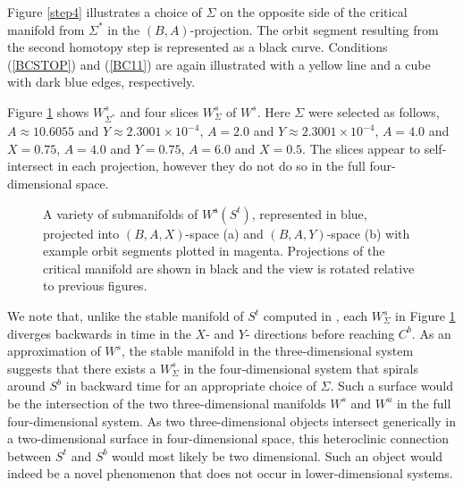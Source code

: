 \documentclass{ws-ijbc}
\begin{document}
Figure \ref{step4} illustrates a choice of $\Sigma$ on the opposite side of the critical manifold from $\Sigma^*$ in the $(B,A)$-projection.  The orbit segment resulting from the second homotopy step is represented as a black curve.  Conditions (\ref{BCSTOP}) and (\ref{BC11}) are again illustrated with a yellow line and a cube with dark blue edges, respectively.
    
Figure \ref{pieces} shows $W^s_{\Sigma^*}$ and four slices $W^{s}_{\Sigma}$ of $W^{s}$.  Here $\Sigma$ were selected as follows, $A\approx10.6055$ and $Y\approx2.3001 \times 10^{-4}$, $A=2.0$ and $Y\approx2.3001 \times 10^{-4}$, $A=4.0$ and $X=0.75$, $A=4.0$ and $Y=0.75$, $A=6.0$ and $X=0.5$.  The slices appear to self-intersect in each projection, however they do not do so in the full four-dimensional space.  

\begin{figure}[h]
\centering
{}
\caption{A variety of submanifolds of $W^{\mathbf{s}}(S^t)$, represented in blue, projected into $(B,A,X)$-space (a) and $(B,A,Y)$-space (b) with example orbit segments plotted in magenta.  Projections of the critical manifold are shown in black and the view is rotated relative to previous figures.}
\label{pieces}
\end{figure}
    
We note that, unlike the stable manifold of $S^t$ computed in \cite{QSSA}, each $W^{s}_{\Sigma}$ in Figure \ref{pieces} diverges backwards in time in the $X$- and $Y$- directions before reaching $C^b$.  As an approximation of $W^s$, the stable manifold in the three-dimensional system suggests that there exists a $W^{s}_{\Sigma}$ in the four-dimensional system that spirals around $S^b$ in backward time for an appropriate choice of $\Sigma$.  Such a surface would be the intersection of the two three-dimensional manifolds $W^s$ and $W^u$ in the full four-dimensional system.  As two three-dimensional objects intersect generically in a two-dimensional surface in four-dimensional space, this heteroclinic connection between $S^t$ and $S^b$ would most likely be two dimensional.  Such an object would indeed be a novel phenomenon that does not occur in lower-dimensional systems.

\newpage

\end{document}
